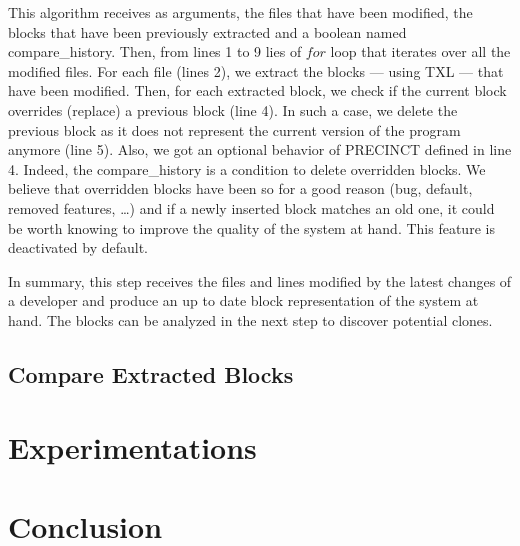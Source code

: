 \documentclass[conference]{IEEEtran}
\begin{document}
This algorithm receives as arguments, the files that have been modified, the blocks that have been previously extracted and a boolean named compare\_history.
Then, from lines 1 to 9 lies of $for$ loop that iterates over all the modified files.
For each file (lines 2), we extract the blocks --- using TXL --- that have been modified. Then, for each extracted block, we check if the current block overrides (replace) a previous block (line 4).
In such a case, we delete the previous block as it does not represent the current version of the program anymore (line 5).
Also, we got an optional behavior of PRECINCT defined in line 4.
Indeed, the compare\_history is a condition to delete overridden blocks.
We believe that overridden blocks have been so for a good reason (bug, default, removed features, \ldots) and if a newly inserted block matches an old one, it could be worth knowing to improve the quality of the system at hand.
This feature is deactivated by default.

In summary, this step receives the files and lines modified by the latest changes of a developer and produce an up to date block representation of the system at hand.
The blocks can be analyzed in the next step to discover potential clones.

\subsection{Compare Extracted Blocks}
\label{sub:Compare Extracted Blocks}




\section{Experimentations}
\label{sec:Experimentations}

\section{Conclusion}
\label{sec:Conclusion}









\end{document}
